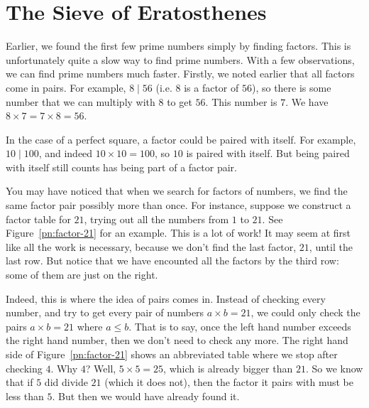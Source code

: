 \documentclass[a4paper,10pt]{report}
\begin{document}
\section{The Sieve of Eratosthenes}

Earlier, we found the first few prime numbers simply by finding factors. This
is unfortunately quite a slow way to find prime numbers. With a few
observations, we can find prime numbers much faster. Firstly, we noted earlier
that all factors come in pairs. For example, \(8 \mid 56\) (i.e. \(8\) is a
factor of \(56\)), so there is some number that we can multiply with \(8\) to
get \(56\). This number is \(7\). We have \(8 \times 7 = 7 \times 8 = 56\).

In the case of a perfect square, a factor could be paired with itself. For
example, \(10 \mid 100\), and indeed \(10 \times 10 = 100\), so \(10\) is
paired with itself. But being paired with itself still counts has being part of
a factor pair.

You may have noticed that when we search for factors of numbers, we find the
same factor pair possibly more than once. For instance, suppose we construct a
factor table for \(21\), trying out all the numbers from \(1\) to \(21\). See
Figure~\ref{pn:factor-21} for an example. This is a lot of work! It may seem at
first like all the work is necessary, because we don't find the last factor,
\(21\), until the last row. But notice that we have encounted all the factors
by the third row: some of them are just on the right.

Indeed, this is where the idea of pairs comes in. Instead of checking every
number, and try to get every pair of numbers \(a \times b = 21\), we could only
check the pairs \(a \times b = 21\) where \(a \le b\). That is to say, once the
left hand number exceeds the right hand number, then we don't need to check any
more. The right hand side of Figure~\ref{pn:factor-21} shows an abbreviated
table where we stop after checking \(4\). Why \(4\)? Well, \(5 \times 5 = 25\),
which is already bigger than \(21\). So we know that if \(5\) did divide \(21\)
(which it does not), then the factor it pairs with must be less than \(5\). But
then we would have already found it.
\end{document}

